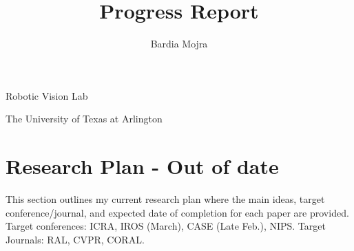 \documentclass[11pt]{article}
\title{Progress Report}
\author{Bardia Mojra}
\begin{document}
\maketitle
\thispagestyle{empty}

\bigskip
\bigskip
\begin{center}
 Robotic Vision Lab
\end{center}

\begin{center}
The University of Texas at Arlington
\end{center}

\newpage

\section{Research Plan - Out of date}
This section outlines my current research plan where the main ideas, target
conference/journal, and expected date of completion for each paper
are provided.
Target conferences: ICRA, IROS (March), CASE (Late Feb.), NIPS.
Target Journals: RAL, CVPR, CORAL.
\end{document}
